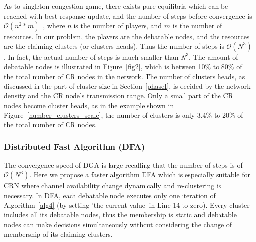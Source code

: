 \documentclass[journal,comsoc]{IEEEtran}
\theoremstyle{mytheoremstyle}
\theoremstyle{mytheoremstyle}
\theoremstyle{mytheoremstyle}
\begin{document}
As to singleton congestion game, there exists pure equilibria which can be reached with best response update, and the number of steps before convergence is $\mathcal{O}(n^2*m)$~\cite{Ackermann06purenash}, where $n$ is the number of players, and $m$ is the number of resources.
In our problem, the players are the debatable nodes, and the resources are the claiming clusters (or clusters heads).
Thus the number of steps is $\mathcal{O}(N^3)$.
In fact, the actual number of steps is much smaller than $N^3$.
The amount of debatable nodes is illustrated in Figure~\ref{fig2}, which is between 10\% to 80\% of the total number of CR nodes in the network.
The number of clusters heads, as discussed in the part of cluster size in Section~\ref{phaseI}, is decided by the network density and the CR node's transmission range.
Only a small part of the CR nodes become cluster heads, as in the example shown in Figure~\ref{number_clusters_scale}, the number of clusters is only 3.4\% to 20\% of the total number of CR nodes.




\subsubsection{Distributed Fast Algorithm (DFA)}
The convergence speed of DGA is large recalling that the number of steps is of $\mathcal{O}(N^3)$.
Here we propose a faster algorithm DFA which is especially suitable for CRN where channel availability change dynamically and re-clustering is necessary. %
In DFA, each debatable node executes only one iteration of Algorithm~\ref{alg4} (by setting 'the current value' in Line 14 to zero).
Every cluster includes all its debatable nodes, thus the membership is static and debatable nodes can make decisions simultaneously without considering the change of membership of its claiming clusters.
\end{document}
